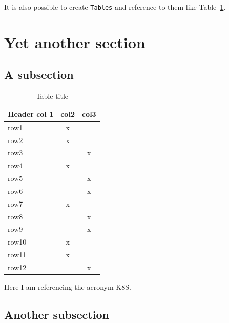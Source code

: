 \blindtext

\blindtext

It is also possible to create \texttt{Tables} and reference to them like Table~\ref{tab:Table}.

\section{Yet another section}

\blindtext 

\subsection{A subsection}

\blindtext 

\begin{table}[htb]
	\centering
	\caption{Table title}\smallskip
	\begin{tabular}{|l|c|c|} \hline
		Header col 1 & col2 & col3 \\ \hline
		row1 &x &\\ \hline
		row2 &x &\\ \hline
		row3 &&x\\ \hline
		row4 &x &\\ \hline
		row5 &&x\\ \hline
		row6 &&x\\ \hline
		row7 &x &\\ \hline
		row8 &&x\\ \hline
		row9 &&x\\ \hline
		row10 &x &\\ \hline
		row11 &x &\\ \hline
		row12 &&x\\ \hline
	\end{tabular}
	\label{tab:Table}
\end{table}

\blindtext
\blindtext

Here I am referencing the acronym \ac{K8S}.

\subsection{Another subsection}

\blindtext